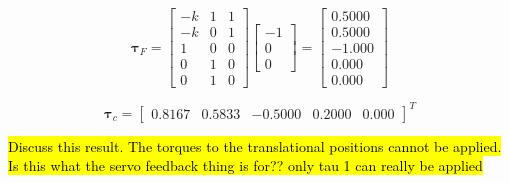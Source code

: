 \begin{equation}
    \boldsymbol{\tau}_F = 
    \begin{bmatrix}
       -k & 1 & 1\\
       -k & 0 & 1\\
       1 & 0 & 0\\
       0 & 1 & 0\\
       0 & 1 & 0
    \end{bmatrix}
    \begin{bmatrix}
        -1 \\ 0 \\ 0
    \end{bmatrix}=
    \begin{bmatrix}
       0.5000\\
       0.5000\\
       -1.000\\
       0.000\\
       0.000
    \end{bmatrix}
\end{equation}

\begin{equation}
    \boldsymbol{\tau}_c =
    \begin{bmatrix}
        0.8167 & 0.5833 & -0.5000 & 0.2000 & 0.000
    \end{bmatrix}^T
\end{equation}

\hl{Discuss this result. The torques to the translational positions cannot be applied. Is this what the servo feedback thing is for?? only tau 1 can really be applied}